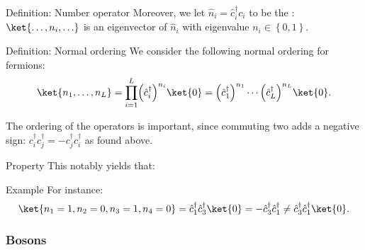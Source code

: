 \documentclass[a4paper]{article}
\begin{document}
\begin{parag}{Definition: Number operator}
    Moreover, we let $\hat{n}_i = \hat{c}_i^{\dagger} c_i$ to be the : $\ket{\ldots, n_i, \ldots}$ is an eigenvector of $\hat{n}_i$ with eigenvalue $n_i \in \left\{0, 1\right\}$.
\end{parag}


\begin{parag}{Definition: Normal ordering}
    We consider the following normal ordering for fermions: 
    \[\ket{n_1, \ldots, n_L} = \prod_{i=1}^{L} \left(\hat{c}_i^{\dagger}\right)^{n_i} \ket{0} = \left(\hat{c}^{\dagger}_1\right)^{n_1} \cdots \left(\hat{c}_L^{\dagger}\right)^{n_L} \ket{0}.\]

    The ordering of the operators is important, since commuting two adds a negative sign: $c_i^{\dagger} c_j^{\dagger} = -c_j^{\dagger} c_i^{\dagger}$ as found above.

    \begin{subparag}{Property}
        This notably yields that: 
    \end{subparag}

    \begin{subparag}{Example}
        For instance: 
        \[\ket{n_1 = 1, n_2 = 0, n_3 = 1, n_4 = 0} = \hat{c}_1^{\dagger} \hat{c}_3^{\dagger} \ket{0} = -\hat{c}_3^{\dagger} \hat{c}_1^{\dagger}\neq \hat{c}_3^{\dagger} \hat{c}_1^{\dagger} \ket{0}.\]
    \end{subparag}
\end{parag}

\subsubsection{Bosons}
\end{document}
